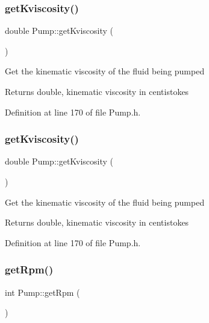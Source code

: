 \subsubsection{\texorpdfstring{get\+Kviscosity()}{getKviscosity()}\hspace{0.1cm}{\footnotesize\ttfamily [2/3]}}
{\footnotesize\ttfamily double Pump\+::get\+Kviscosity (\begin{DoxyParamCaption}{ }\end{DoxyParamCaption})\hspace{0.3cm}{\ttfamily [inline]}}

Get the kinematic viscosity of the fluid being pumped

\begin{DoxyReturn}{Returns}
double, kinematic viscosity in centistokes 
\end{DoxyReturn}


Definition at line 170 of file Pump.\+h.

\mbox{\label{class_pump_a7b834ffb06cbfd643043e3a26ca1af6e}} 
\subsubsection{\texorpdfstring{get\+Kviscosity()}{getKviscosity()}\hspace{0.1cm}{\footnotesize\ttfamily [3/3]}}
{\footnotesize\ttfamily double Pump\+::get\+Kviscosity (\begin{DoxyParamCaption}{ }\end{DoxyParamCaption})\hspace{0.3cm}{\ttfamily [inline]}}

Get the kinematic viscosity of the fluid being pumped

\begin{DoxyReturn}{Returns}
double, kinematic viscosity in centistokes 
\end{DoxyReturn}


Definition at line 170 of file Pump.\+h.

\mbox{\label{class_pump_a66870deae37979d64a910b89c6977b26}} 
\subsubsection{\texorpdfstring{get\+Rpm()}{getRpm()}\hspace{0.1cm}{\footnotesize\ttfamily [1/3]}}
{\footnotesize\ttfamily int Pump\+::get\+Rpm (\begin{DoxyParamCaption}{ }\end{DoxyParamCaption})}

